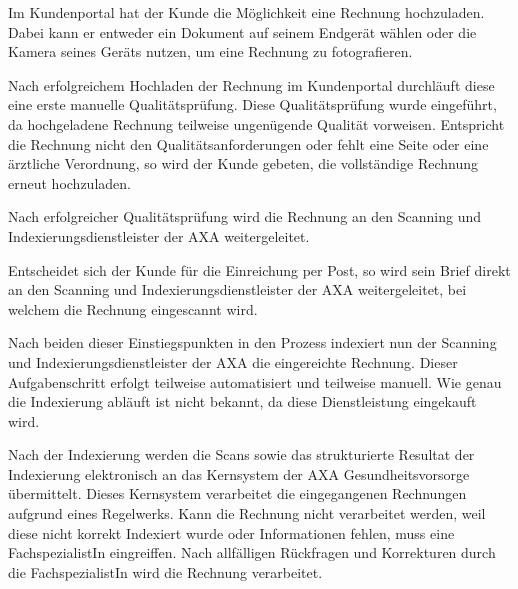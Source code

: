 
Im Kundenportal hat der Kunde die Möglichkeit eine Rechnung hochzuladen. Dabei kann er entweder ein Dokument auf seinem Endgerät wählen oder die Kamera seines Geräts nutzen, um eine Rechnung zu fotografieren.

Nach erfolgreichem Hochladen der Rechnung im Kundenportal durchläuft diese eine erste manuelle Qualitätsprüfung. Diese Qualitätsprüfung wurde eingeführt, da hochgeladene Rechnung teilweise ungenügende Qualität vorweisen. Entspricht die Rechnung nicht den Qualitätsanforderungen oder fehlt eine Seite oder eine ärztliche Verordnung, so wird der Kunde gebeten, die vollständige Rechnung erneut hochzuladen.

Nach erfolgreicher Qualitätsprüfung wird die Rechnung an den Scanning und Indexierungsdienstleister der AXA weitergeleitet.

Entscheidet sich der Kunde für die Einreichung per Post, so wird sein Brief direkt an den Scanning und Indexierungsdienstleister der AXA weitergeleitet, bei welchem die Rechnung eingescannt wird.

Nach beiden dieser Einstiegspunkten in den Prozess indexiert nun der Scanning und Indexierungsdienstleister der AXA die eingereichte Rechnung. Dieser Aufgabenschritt erfolgt teilweise automatisiert und teilweise manuell. Wie genau die Indexierung abläuft ist nicht bekannt, da diese Dienstleistung eingekauft wird.

Nach der Indexierung werden die Scans sowie das strukturierte Resultat der Indexierung elektronisch an das Kernsystem der AXA Gesundheitsvorsorge übermittelt. Dieses Kern\-system verarbeitet die eingegangenen Rechnungen aufgrund eines Regelwerks. Kann die Rechnung nicht verarbeitet werden, weil diese nicht korrekt Indexiert wurde oder Informationen fehlen, muss eine FachspezialistIn eingreiffen. Nach allfälligen Rückfragen und Korrekturen durch die FachspezialistIn wird die Rechnung verarbeitet. 


